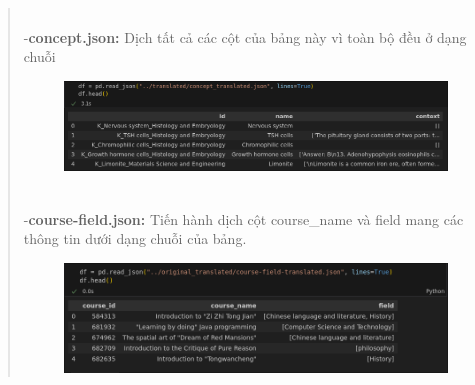 \begin{quote}
\begin{figure}[h]
\end{figure}\\
-\textbf{concept.json:} Dịch tất cả các cột của bảng này vì toàn bộ đều ở dạng chuỗi\\
\begin{figure}[h]
    \centering
    \includegraphics[width=1\linewidth]{figures/5.png}
\end{figure}\\
-\textbf{course-field.json:} Tiến hành dịch cột course\_name và field mang các thông tin dưới dạng chuỗi của bảng.\\
\begin{figure}[h]
    \centering
    \includegraphics[width=1\linewidth]{figures/6.png}
\end{figure}
\end{quote}
